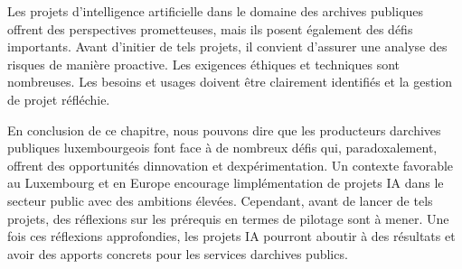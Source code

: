 Les projets d'intelligence artificielle dans le domaine des archives
publiques offrent des perspectives prometteuses, mais ils posent
également des défis importants. Avant d'initier de tels projets, il convient
d'assurer une analyse des risques de manière proactive. Les exigences
éthiques et techniques sont nombreuses. Les besoins et usages doivent
être clairement identifiés et la gestion de projet réfléchie. \newline

En conclusion de ce chapitre, nous pouvons dire que les producteurs d\textquotesingle archives publiques luxembourgeois font
face à de nombreux défis qui, paradoxalement, offrent des opportunités
d\textquotesingle innovation et d\textquotesingle expérimentation. Un
contexte favorable au Luxembourg et en Europe encourage
l\textquotesingle implémentation de projets IA dans le secteur public
avec des ambitions élevées. Cependant, avant de lancer de tels projets,
des réflexions sur les prérequis en termes de pilotage sont à mener. Une
fois ces réflexions approfondies, les projets IA pourront aboutir à des
résultats et avoir des apports concrets pour les services
d\textquotesingle archives publics.